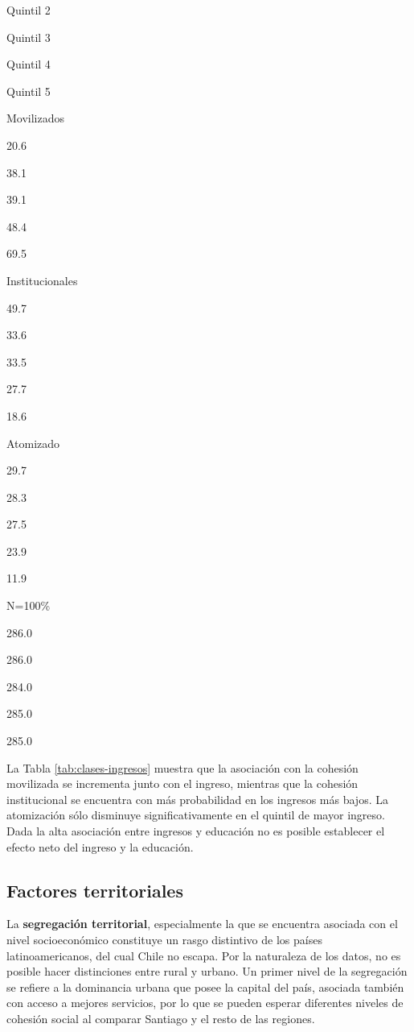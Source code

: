 \documentclass[
  12pt,
]{book}
\begin{document}
Quintil 2

Quintil 3

Quintil 4

Quintil 5

Movilizados

20.6

38.1

39.1

48.4

69.5

Institucionales

49.7

33.6

33.5

27.7

18.6

Atomizado

29.7

28.3

27.5

23.9

11.9

N=100\%

286.0

286.0

284.0

285.0

285.0

La Tabla \ref{tab:clases-ingresos} muestra que la asociación con la cohesión movilizada se incrementa junto con el ingreso, mientras que la cohesión institucional se encuentra con más probabilidad en los ingresos más bajos. La atomización sólo disminuye significativamente en el quintil de mayor ingreso. Dada la alta asociación entre ingresos y educación no es posible establecer el efecto neto del ingreso y la educación.

\hypertarget{factores-territoriales}{%
\subsection{Factores territoriales}\label{factores-territoriales}}

La \textbf{segregación territorial}, especialmente la que se encuentra asociada con el nivel socioeconómico constituye un rasgo distintivo de los países latinoamericanos, del cual Chile no escapa. Por la naturaleza de los datos, no es posible hacer distinciones entre rural y urbano. Un primer nivel de la segregación se refiere a la dominancia urbana que posee la capital del país, asociada también con acceso a mejores servicios, por lo que se pueden esperar diferentes niveles de cohesión social al comparar Santiago y el resto de las regiones.
\end{document}
